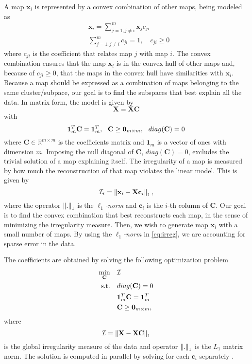 A map $\mathbf{x}_i$ is represented by a convex combination of other maps, being modeled as
\begin{align}
    &\mathbf{x}_i = \sum_{j=1, j\neq i}^m \mathbf{x}_j c_{ji} \label{eq:map-model}\\
    &\sum_{j=1, j \neq i}^{m} c_{ji} = 1, \quad c_{ji} \geq 0 \nonumber 
\end{align}
where $c_{ji}$ is the coefficient that relates map $j$ with map $i$.
%
The convex combination ensures that the map $\mathbf{x}_i$ is in the convex hull of other maps and, because of $c_{ji} \geq 0$, that the maps in the convex hull have similarities with $\mathbf{x}_i$.
Because a map should be expressed as a combination of maps belonging to the same cluster/subpace, our goal is to find the subspaces that best explain all the data.
In matrix form, the model is given by
%
\begin{equation}
    \mathbf{X}=\mathbf{XC} \label{eq:model-matrix}
\end{equation}
with
\begin{equation}
   \mathbf{1}_m^T \mathbf{C} = \mathbf{1}_m^T\mathrm{,}\hspace*{3mm} \mathbf{C} \geq \mathbf{0}_{m\times m}\mathrm{,}\hspace*{3mm} diag(\mathbf{C}) = 0 \nonumber
\end{equation}
where $\mathbf{C} \in \mathbb{R}^{m\times m}$ is the coefficients matrix and $\mathbf{1}_m$ is a vector of ones with dimension $m$. 
Imposing the null diagonal of $\mathbf{C}$, $diag(\mathbf{C})=0$, excludes the trivial solution of a map explaining itself.
The irregularity of a map is measured by how much the reconstruction of that map violates the linear model.
%
This is given by 
\begin{equation}
    \mathbf{\mathcal{I}}_i=\left\lVert\mathbf{x}_i-\mathbf{Xc}_i\right\rVert_1,
\label{eq:irreg}
\end{equation}
where the operator $\left\lVert.\right\rVert_1$ is the \emph{$\ell_1$-norm} and $\mathbf{c}_i$ is the $i$-th column of $\mathbf{C}$.
Our goal is to find the convex combination that best reconstructs each map, in the sense of minimizing the irregularity measure.
Then, we wish to generate map $\mathbf{x}_i$ with a small number of maps.
By using the \emph{$\ell_1$-norm} in \eqref{eq:irreg}, we are accounting for sparse error in the data.

The coefficients are obtained by solving the following optimization problem
\begin{align}
	\min_{\mathbf{C}}\quad & \mathcal{I} \label{eq:mfs} \\
	\textup{s.t.}\quad & diag(\mathbf{C})=0\nonumber \\
	& \mathbf{1}_m^T \mathbf{C} = \mathbf{1}_m^T \nonumber\\
	& \mathbf{C} \geq \mathbf{0}_{m\times m},\nonumber 
\end{align}
where
\begin{equation}
	\mathcal{I}=\left\lVert\mathbf{X-XC}\right\rVert_{1} 
\end{equation}
is the global irregularity measure of the data and operator $\left\lVert.\right\rVert_{1}$ is the $L_{1}$ matrix norm. The solution is computed in parallel by solving for each $\mathbf{c}_i$ separately \cite{oat2016mfs}.

